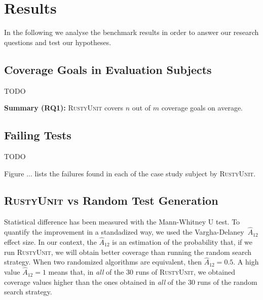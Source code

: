 \documentclass[paper=a4,%
  twoside,%
  BCOR4mm,%
  abstract=true,%
  toc=bibliography,%
  chapterprefix=true,%
  toc=bibliographynumbered,%
  open=right,%
  english,%
  pagesize=pdftex]{scrreprt}
\newcommand{\tech}{\textsc{RustyUnit}\xspace}
\newcommand{\runs}{30\xspace}
\begin{document}
\section{Results}
\label{sec:results}
In the following we analyse the benchmark results in order to answer our research questions and test our hypotheses. 

\subsection{Coverage Goals in Evaluation Subjects}

TODO 
\begin{tcolorbox}
\textbf{Summary (RQ1):} \tech covers $n$ out of $m$ coverage goals on average.  
\end{tcolorbox}

\subsection{Failing Tests}
TODO 

Figure ... lists the failures found in each of the case study subject by \tech. 

\subsection{\tech vs Random Test Generation}
Statistical difference has been measured with the Mann-Whitney U test. To quantify the improvement in a standadized way, we used the Vargha-Delaney~$\hat{A}_{12}$ effect size. In our context, the $\hat{A}_{12}$ is an estimation of the probability that, if we run \tech, we will obtain better coverage than running the random search strategy. When two randomized algorithms are equivalent, then $\hat{A}_{12} = 0.5$. A high value $\hat{A}_{12} = 1$ means that, in \textit{all} of the \runs runs of \tech, we obtained coverage values higher than the ones obtained in \textit{all} of the \runs runs of the random search strategy.
\end{document}
